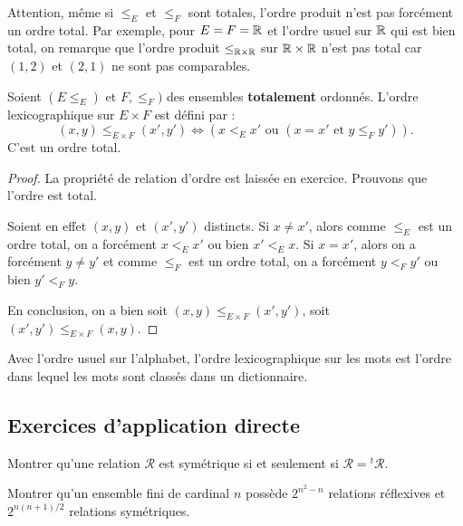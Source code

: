 Attention, même si $\leq_E$ et $\leq_F$ sont totales, l'ordre produit n'est pas forcément un ordre total. Par exemple, pour $E=F=\mathbb{R}$ et l'ordre usuel sur $\mathbb{R}$ qui est bien total, on remarque que l'ordre produit $\leq_{\mathbb{R}\times\mathbb{R}}$ sur $\mathbb{R}\times \mathbb{R}$ n'est pas total car $(1,2)$ et $(2,1)$ ne sont pas comparables.

\begin{propdef}
Soient $(E\leq_E)$ et $F,\leq_F)$ des ensembles \textbf{totalement} ordonnés.
L'ordre lexicographique sur $E\times F$ est défini par :
\[
(x,y) \leq_{E\times F} (x',y') \iff \left(x<_E x' \text{ ou } (x=x' \text{ et } y\leq_F y')\right).
\]
C'est un ordre total.
\end{propdef}
\begin{proof}
La propriété de relation d'ordre est laissée en exercice. Prouvons que l'ordre est total.

Soient en effet $(x,y)$ et $(x',y')$ distincts.
Si $x\neq x'$, alors comme $\leq_E$ est un ordre total, on a forcément $x<_E x'$ ou bien $x'<_E x$.
Si $x=x'$, alors on a forcément $y\neq y'$ et comme $\leq_F$ est un ordre total, on a forcément $y <_F y'$ ou bien $y'<_F y$.

En conclusion, on a bien soit $(x,y) \leq_{E\times F} (x',y')$, soit  $(x',y') \leq_{E\times F} (x,y)$.
\end{proof}

\begin{exemple}
Avec l'ordre usuel sur l'alphabet, l'ordre lexicographique sur les mots est l'ordre dans lequel les mots sont classés dans un dictionnaire.
\end{exemple}



\subsection{Exercices d'application directe}


\begin{exercice}
Montrer qu'une relation $\mathcal R$ est symétrique si et seulement si $\mathcal R = {}^t\mathcal R$.
\end{exercice}
\begin{exercice}
Montrer qu'un ensemble fini de cardinal $n$ possède $2^{n^2-n}$ relations réflexives et $2^{n(n+1)/2}$ relations symétriques.
\end{exercice}


